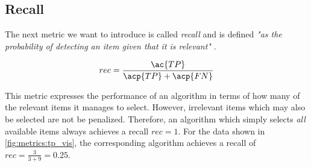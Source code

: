 \subsection{Recall}
\label{chp:fundamentals:sec:metrics:subsec:Recall}

The next metric we want to introduce is called \textit{recall} and is defined \textit{"as the probability of detecting an item given that it is relevant"} \parencite{Zhu:2004}.

\begin{equation}\label{eq:recall}
    rec = \frac{\ac{TP}}{\acp{TP}+\acp{FN}}
\end{equation}

This metric expresses the performance of an algorithm in terms of how many of the relevant items it manages to select.
However, irrelevant items which may also be selected are not be penalized.
Therefore, an algorithm which simply selects \textit{all} available items always achieves a recall $rec=1$.
For the data shown in \cref{fig:metrics:tp_vis}, the corresponding algorithm achieves a recall of $rec = \frac{3}{3+9} = 0.25$.
